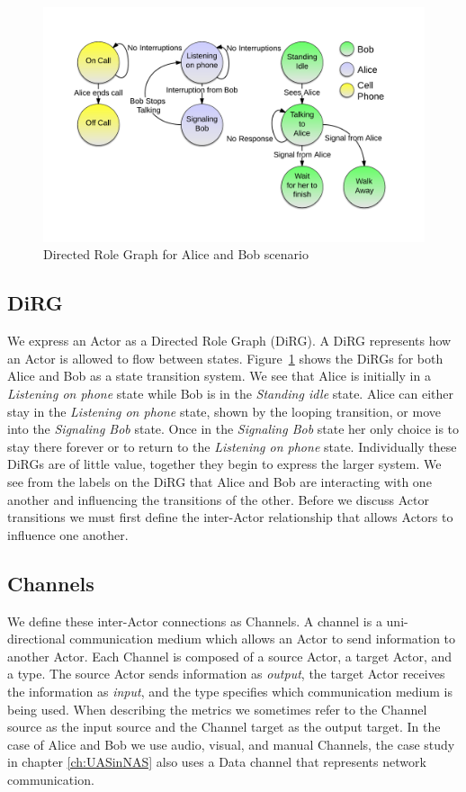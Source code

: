 \begin{figure}[h]
\begin{center}
\includegraphics[width=\textwidth]{ab_dirg.png}
\caption{Directed Role Graph for Alice and Bob scenario}
\label{fig:ab_dirg}
\end{center}
\end{figure}

\subsection{DiRG}
We express an Actor as a Directed Role Graph (DiRG).  A DiRG represents how an Actor is allowed to flow between states.  Figure~\ref{fig:ab_dirg} shows the DiRGs for both Alice and Bob as a state transition system.  We see that Alice is initially in a {\em Listening on phone} state while Bob is in the {\em Standing idle} state.  Alice can either stay in the {\em Listening on phone} state, shown by the looping transition, or move into the {\em Signaling Bob} state.  Once in the {\em Signaling Bob} state her only choice is to stay there forever or to return to the {\em Listening on phone} state.  Individually these DiRGs are of little value, together they begin to express the larger system.  We see from the labels on the DiRG that Alice and Bob are interacting with one another and influencing the transitions of the other.  Before we discuss Actor transitions we must first define the inter-Actor relationship that allows Actors to influence one another.


\subsection{Channels}
We define these inter-Actor connections as Channels.  A channel is a uni-directional communication medium which allows an Actor to send information to another Actor.  Each Channel is composed of a source Actor, a target Actor, and a type.  The source Actor sends information as {\em output}, the target Actor receives the information as {\em input}, and the type specifies which communication medium is being used.  When describing the metrics we sometimes refer to the Channel source as the input source and the Channel target as the output target.  In the case of Alice and Bob we use audio, visual, and manual Channels\cite{wickens2002multiple}, the case study in chapter \ref{ch:UASinNAS} also uses a Data channel that represents network communication.  

